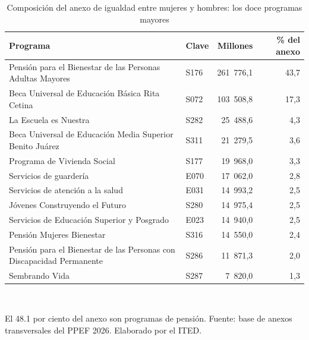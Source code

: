 \begin{table}[htbp]
\centering
\scriptsize
\caption{Composición del anexo de igualdad entre mujeres y hombres: los doce programas mayores}
\label{cua:C12_2}
\begin{tabular}{p{7.6cm}p{1.4cm}rr}
\toprule
\textbf{Programa} & \textbf{Clave} & \textbf{Millones} & \textbf{\% del anexo} \\
\midrule
Pensión para el Bienestar de las Personas Adultas Mayores & S176 & 261 776,1 & 43,7 \\
Beca Universal de Educación Básica Rita Cetina & S072 & 103 508,8 & 17,3 \\
La Escuela es Nuestra & S282 & 25 488,6 & 4,3 \\
Beca Universal de Educación Media Superior Benito Juárez & S311 & 21 279,5 & 3,6 \\
Programa de Vivienda Social & S177 & 19 968,0 & 3,3 \\
Servicios de guardería & E070 & 17 062,0 & 2,8 \\
Servicios de atención a la salud & E031 & 14 993,2 & 2,5 \\
Jóvenes Construyendo el Futuro & S280 & 14 975,4 & 2,5 \\
Servicios de Educación Superior y Posgrado & E023 & 14 940,0 & 2,5 \\
Pensión Mujeres Bienestar & S316 & 14 550,0 & 2,4 \\
Pensión para el Bienestar de las Personas con Discapacidad Permanente & S286 & 11 871,3 & 2,0 \\
Sembrando Vida & S287 & 7 820,0 & 1,3 \\
\bottomrule
\end{tabular}
\\[2pt]\begin{minipage}{0.92\textwidth}\scriptsize El 48.1 por ciento del anexo son programas de pensión. Fuente: base de anexos transversales del PPEF 2026. Elaborado por el ITED.\end{minipage}
\end{table}

